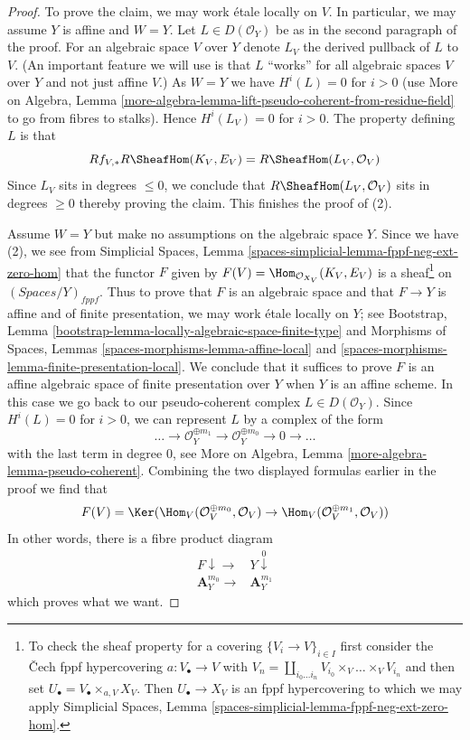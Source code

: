 \begin{proof}
\medskip\noindent
To prove the claim, we may work \'etale locally on $V$.
In particular, we may assume $Y$ is affine and $W = Y$.
Let $L \in D(\mathcal{O}_Y)$ be as in the second paragraph of the proof.
For an algebraic space $V$ over $Y$ denote $L_V$ the derived pullback of
$L$ to $V$. (An important feature we will use is that $L$ ``works'' for all
algebraic spaces $V$ over $Y$ and not just affine $V$.)
As $W = Y$ we have $H^i(L) = 0$ for $i > 0$
(use More on Algebra, Lemma
\ref{more-algebra-lemma-lift-pseudo-coherent-from-residue-field}
to go from fibres to stalks). Hence $H^i(L_V) = 0$ for $i > 0$.
The property defining $L$ is that
$$
Rf_{V, *}R\SheafHom(K_V, E_V) = R\SheafHom(L_V, \mathcal{O}_V)
$$
Since $L_V$ sits in degrees $\leq 0$, we conclude that
$R\SheafHom(L_V, \mathcal{O}_V)$ sits in degrees $\geq 0$
thereby proving the claim. This finishes the proof of (2).

\medskip\noindent
Assume $W = Y$ but make no assumptions on the algebraic space $Y$.
Since we have (2), we see from
Simplicial Spaces, Lemma \ref{spaces-simplicial-lemma-fppf-neg-ext-zero-hom}
that the functor $F$ given by $F(V) = \Hom_{\mathcal{O}_{X_V}}(K_V, E_V)$
is a sheaf\footnote{To check the sheaf property
for a covering $\{V_i \to V\}_{i \in I}$ first consider the
{\v C}ech fppf hypercovering $a : V_\bullet \to V$ with
$V_n = \coprod_{i_0 \ldots i_n} V_{i_0} \times_V \ldots \times_V V_{i_n}$
and then set $U_\bullet = V_\bullet \times_{a, V} X_V$. Then
$U_\bullet \to X_V$ is an fppf hypercovering to which we may
apply Simplicial Spaces, Lemma
\ref{spaces-simplicial-lemma-fppf-neg-ext-zero-hom}.}
on $(\textit{Spaces}/Y)_{fppf}$. Thus to prove that $F$
is an algebraic space and that $F \to Y$ is affine and of
finite presentation, we may work \'etale locally on $Y$; see
Bootstrap, Lemma \ref{bootstrap-lemma-locally-algebraic-space-finite-type}
and
Morphisms of Spaces, Lemmas \ref{spaces-morphisms-lemma-affine-local} and
\ref{spaces-morphisms-lemma-finite-presentation-local}. We conclude
that it suffices to prove $F$ is an affine algebraic space of
finite presentation over $Y$ when $Y$ is an affine scheme. In this
case we go back to our pseudo-coherent complex $L \in D(\mathcal{O}_Y)$.
Since $H^i(L) = 0$ for $i > 0$, we can represent $L$ by a complex
of the form
$$
\ldots \to \mathcal{O}_Y^{\oplus m_1} \to \mathcal{O}_Y^{\oplus m_0}
\to 0 \to \ldots
$$
with the last term in degree $0$, see More on Algebra, Lemma
\ref{more-algebra-lemma-pseudo-coherent}. Combining the two displayed formulas
earlier in the proof we find that
$$
F(V) =
\Ker(
\Hom_V(\mathcal{O}_V^{\oplus m_0}, \mathcal{O}_V)
\to
\Hom_V(\mathcal{O}_V^{\oplus m_1}, \mathcal{O}_V)
)
$$
In other words, there is a fibre product diagram
$$
\begin{array}{cc}F \downarrow\longrightarrow & Y \overset{0}{\downarrow} \\ \mathbf{A}_Y^{m_0} \longrightarrow & \mathbf{A}_Y^{m_1}\end{array}
$$
which proves what we want.
\end{proof}

